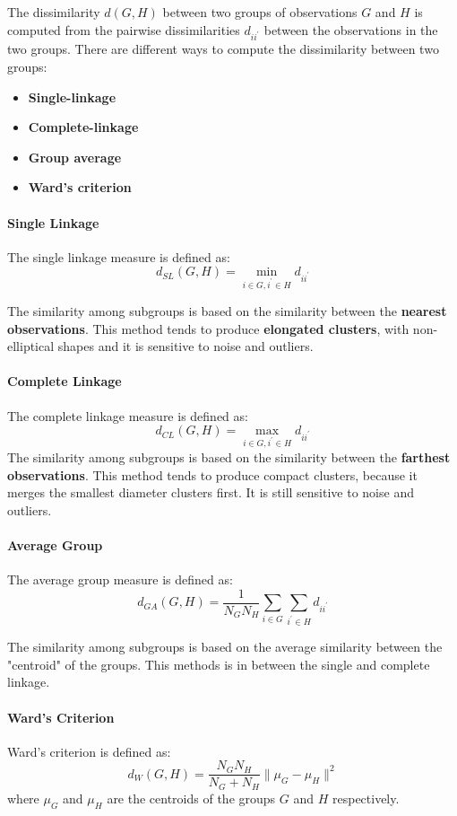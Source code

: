 The dissimilarity $d(G,H)$ between two groups of observations $G$ and $H$ is computed from the pairwise dissimilarities $d_{ii^{\prime}}$ between the observations in the two groups. There are different ways to compute the dissimilarity between two groups:
\begin{itemize}
    \item \textbf{Single-linkage}
    \item \textbf{Complete-linkage}
    \item \textbf{Group average}
    \item \textbf{Ward's criterion}
\end{itemize}

\paragraph*{Single Linkage}
The single linkage measure is defined as:
\[
    d_{SL}(G,H) = \min_{i \in G, i^{\prime} \in H} d_{ii^{\prime}}
\]

The similarity among subgroups is based on the similarity between the \textbf{nearest observations}. This method tends to produce \textbf{elongated clusters}, with non-elliptical shapes and it is sensitive to noise and outliers.

\paragraph*{Complete Linkage}
The complete linkage measure is defined as:
\[
    d_{CL}(G,H) = \max_{i \in G, i^{\prime} \in H} d_{ii^{\prime}}
\]
The similarity among subgroups is based on the similarity between the \textbf{farthest observations}. This method tends to produce compact clusters, because it merges the smallest diameter clusters first. It is still sensitive to noise and outliers.

\paragraph*{Average Group}
The average group measure is defined as:
\[
    d_{GA}(G,H) = \frac{1}{N_G N_H} \sum_{i \in G} \sum_{i^{\prime} \in H} d_{ii^{\prime}}
\]

The similarity among subgroups is based on the average similarity between the "centroid" of the groups. This methods is in between the single and complete linkage.

\paragraph*{Ward's Criterion}
Ward's criterion is defined as:
\[
    d_W(G,H) = \frac{N_G N_H}{N_G + N_H} \| \mu_G - \mu_H \|^2
\]
where $\mu_G$ and $\mu_H$ are the centroids of the groups $G$ and $H$ respectively.

